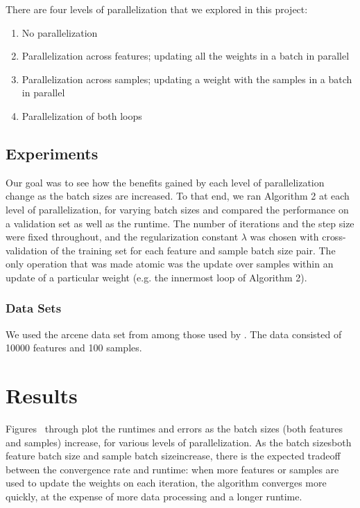 \documentclass{article}
\begin{document}
There are four levels of parallelization that we explored in this project:
\begin{enumerate}
\item
No parallelization
\item
Parallelization across features; updating all the weights in a batch in parallel
\item
Parallelization across samples; updating a weight with the samples in a batch in parallel
\item
Parallelization of both loops
\end{enumerate}
\subsection{Experiments}
Our goal was to see how the benefits gained by each level of parallelization change as the batch sizes are increased.  To that end, we ran Algorithm 2 at each level of parallelization, for varying batch sizes and compared the performance on a validation set as well as the runtime. The number of iterations and the step size were fixed throughout, and the regularization constant $\lambda$ was chosen with cross-validation of the training set for each feature and sample batch size pair. The only operation that was made atomic was the update over samples within an update of a particular weight (e.g. the innermost loop of Algorithm 2).
\subsubsection{Data Sets}
We used the arcene data set from among those used by \cite{shotgun2011}. The data consisted of 10000 features and 100 samples.

\section{Results}


Figures~\cite{fig:NAME1} through \cite{fig:NAMEn} plot the runtimes and errors as the batch sizes (both features and samples) increase, for various levels of parallelization. As the batch sizes\textemdash both feature batch size and sample batch size\textemdash increase, there is the expected tradeoff between the convergence rate and runtime: when more features or samples are used to update the weights on each iteration, the algorithm converges more quickly, at the expense of more data processing and a longer runtime.
\end{document}
